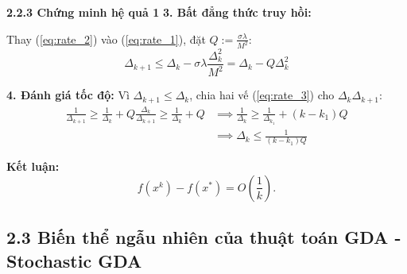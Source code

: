 \begin{frame}{\textbf{\large 2.2.3 Chứng minh hệ quả 1}}
    \vspace*{-1cm}
    \textbf{3. Bất đẳng thức truy hồi:}
    
    Thay (\ref{eq:rate_2}) vào (\ref{eq:rate_1}), đặt $Q := \frac{\sigma \lambda}{M^2}$:
    \begin{equation} \label{eq:rate_3}
        \Delta_{k+1} \le \Delta_k - \sigma \lambda \frac{\Delta_k^2}{M^2} = \Delta_k - Q \Delta_k^2
    \end{equation}

    \textbf{4. Đánh giá tốc độ:}
    Vì $\Delta_{k+1} \le \Delta_k$, chia hai vế (\ref{eq:rate_3}) cho $\Delta_k \Delta_{k+1}$:
    \begin{align*}
        \frac{1}{\Delta_{k+1}} \ge \frac{1}{\Delta_k} + Q \frac{\Delta_k}{\Delta_{k+1}} \ge \frac{1}{\Delta_k} + Q 
        &\implies \frac{1}{\Delta_k} \ge \frac{1}{\Delta_{k_1}} + (k - k_1)Q \\
        &\implies \Delta_k \le \frac{1}{(k - k_1)Q}
    \end{align*}

    \textbf{Kết luận:} $$ f(x^k) - f(x^*) = O\left(\frac{1}{k}\right).$$
\end{frame}
\subsection{2.3 Biến thể ngẫu nhiên của thuật toán GDA - Stochastic GDA}



